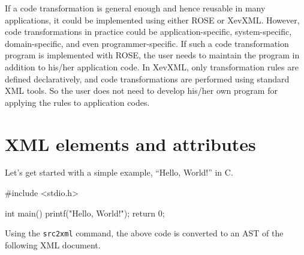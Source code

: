 If a code transformation is general enough and hence reusable in many
applications, it could be implemented using either ROSE or XevXML.
However, code transformations in practice could be application-specific,
system-specific, domain-specific, and even programmer-specific. If such
a code transformation program is implemented with ROSE, the user needs
to maintain the program in addition to his/her application code. In
XevXML, only transformation rules are defined declaratively, and code
transformations are performed using standard XML tools. So the user does
not need to develop his/her own program for applying the rules to
application codes.






\section{XML elements and attributes}\label{sec:xml}
Let's get started with a simple example, ``Hello, World!'' in C.
\begin{framed}
\begin{src}
#include <stdio.h>

int main()
{
  printf("Hello, World!\n");
  return 0;
}
\end{src}
\end{framed}


Using the \texttt{src2xml} command, the above code is converted to an
AST of the following XML document.

